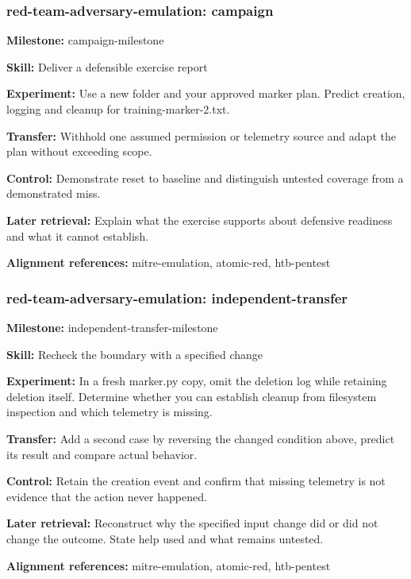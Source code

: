 \subsubsection{red-team-adversary-emulation: campaign}
\noindent\textbf{Milestone:} campaign-milestone\par
\noindent\textbf{Skill:} Deliver a defensible exercise report\par
\noindent\textbf{Experiment:} Use a new folder and your approved marker plan. Predict creation, logging and cleanup for training-marker-2.txt.\par
\noindent\textbf{Transfer:} Withhold one assumed permission or telemetry source and adapt the plan without exceeding scope.\par
\noindent\textbf{Control:} Demonstrate reset to baseline and distinguish untested coverage from a demonstrated miss.\par
\noindent\textbf{Later retrieval:} Explain what the exercise supports about defensive readiness and what it cannot establish.\par
\noindent\textbf{Alignment references:} mitre-emulation, atomic-red, htb-pentest\par
\subsubsection{red-team-adversary-emulation: independent-transfer}
\noindent\textbf{Milestone:} independent-transfer-milestone\par
\noindent\textbf{Skill:} Recheck the boundary with a specified change\par
\noindent\textbf{Experiment:} In a fresh marker.py copy, omit the deletion log while retaining deletion itself. Determine whether you can establish cleanup from filesystem inspection and which telemetry is missing.\par
\noindent\textbf{Transfer:} Add a second case by reversing the changed condition above, predict its result and compare actual behavior.\par
\noindent\textbf{Control:} Retain the creation event and confirm that missing telemetry is not evidence that the action never happened.\par
\noindent\textbf{Later retrieval:} Reconstruct why the specified input change did or did not change the outcome. State help used and what remains untested.\par
\noindent\textbf{Alignment references:} mitre-emulation, atomic-red, htb-pentest\par
